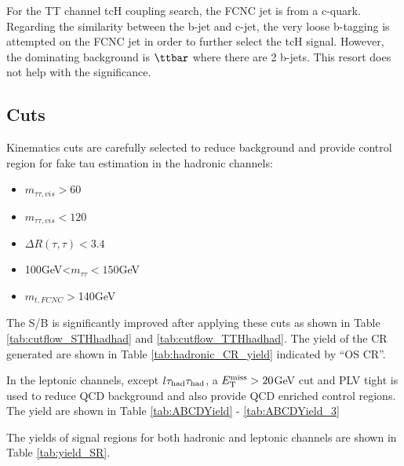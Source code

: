 For the TT channel tcH coupling search, the FCNC jet is from a c-quark. Regarding the similarity between the b-jet and c-jet, the very loose b-tagging is attempted on the FCNC jet in order to further select the tcH signal. However, the dominating background is $\ttbar$ where there are 2 b-jets. This resort does not help with the significance.

\subsection{Cuts}
\label{sec:cuts}

Kinematics cuts are carefully selected to reduce background and provide control region for fake tau estimation in the hadronic channels:
\begin{itemize}
  \item $m_{\tau\tau,vis}>60$
  \item $m_{\tau\tau,vis}<120$
  \item $\Delta R(\tau,\tau)<3.4$
  \item 100GeV<$m_{\tau\tau}<150$GeV
  \item $m_{t,FCNC}>$140GeV
\end{itemize}

The S/B is significantly improved after applying these cuts as shown in Table \ref{tab:cutflow_STHhadhad} and \ref{tab:cutflow_TTHhadhad}. The yield of the CR generated are shown in Table \ref{tab:hadronic_CR_yield} indicated by ``OS CR''.

In the leptonic channels, except $l\tau_\text{had}{}\tau_\text{had}$, a $E_{\text{T}}^{\text{miss}}>20$GeV cut and PLV tight is used to reduce QCD background and also provide QCD enriched control regions. The yield are shown in Table \ref{tab:ABCDYield} - \ref{tab:ABCDYield_3}

The yields of signal regions for both hadronic and leptonic channels are shown in Table \ref{tab:yield_SR}.
